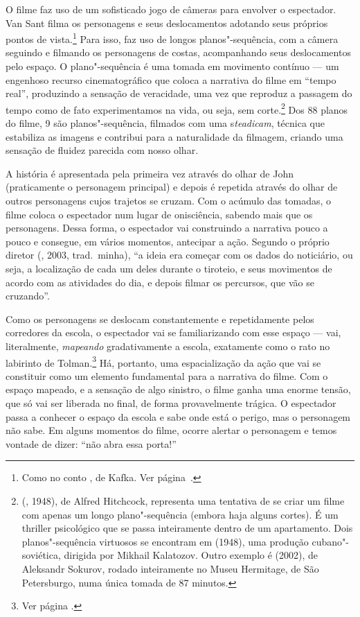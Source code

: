 O filme faz uso de um sofisticado jogo de câmeras para envolver o
espectador. Van Sant filma os personagens e seus deslocamentos adotando
seus próprios pontos de vista.\footnote{Como no conto {}, de Kafka. Ver página~\pageref{construcao}.} Para isso, faz uso
de longos planos"-sequência, com a câmera seguindo e filmando os
personagens de costas, acompanhando seus deslocamentos pelo espaço. O
plano"-sequência é uma tomada em movimento contínuo --- um engenhoso
recurso cinematográfico que coloca a narrativa do filme em ``tempo
real'', produzindo a sensação de veracidade, uma vez que reproduz a
passagem do tempo como de fato experimentamos na vida, ou seja, sem
corte.\footnote{{} ({}, 1948), de Alfred
  Hitchcock, representa uma tentativa de se criar um filme com apenas um
  longo plano"-sequência (embora haja alguns cortes). É um
  thriller psicológico que se passa inteiramente dentro de um
  apartamento. Dois planos"-sequência virtuosos se encontram em {} (1948), uma produção cubano"-soviética, dirigida por Mikhail
  Kalatozov. Outro exemplo é {} (2002), de Aleksandr
  Sokurov, rodado inteiramente no Museu Hermitage, de São Petersburgo,
  numa única tomada de 87 minutos.} Dos 88 planos do filme, 9 são
planos"-sequência, filmados com uma s\emph{teadicam}, técnica que
estabiliza as imagens e contribui para a naturalidade da filmagem,
criando uma sensação de fluidez parecida com nosso olhar.

A história é apresentada pela primeira vez através do olhar de John
(praticamente o personagem principal) e depois é repetida através do
olhar de outros personagens cujos trajetos se cruzam. Com o acúmulo das
tomadas, o filme coloca o espectador num lugar de onisciência, sabendo
mais que os personagens. Dessa forma, o espectador vai construindo a
narrativa pouco a pouco e consegue, em vários momentos, antecipar a
ação. Segundo o próprio diretor (, 2003, trad.~minha), ``a ideia
era começar com os dados do noticiário, ou seja, a localização de cada
um deles durante o tiroteio, e seus movimentos de acordo com as
atividades do dia, e depois filmar os percursos, que vão se cruzando''.

Como os personagens se deslocam constantemente e repetidamente pelos
corredores da escola, o espectador vai se familiarizando com esse espaço
--- vai, literalmente, \emph{mapeando} gradativamente a escola,
exatamente como o rato no labirinto de Tolman.\footnote{Ver página \pageref{tolman}.} Há, portanto, uma
espacialização da ação que vai se constituir como um elemento
fundamental para a narrativa do filme. Com o espaço mapeado, e a
sensação de algo sinistro, o filme ganha uma enorme tensão, que só vai
ser liberada no final, de forma provavelmente trágica. O espectador
passa a conhecer o espaço da escola e sabe onde está o perigo, mas o
personagem não sabe. Em alguns momentos do filme, ocorre alertar o
personagem e temos vontade de dizer: ``não abra essa porta!''

